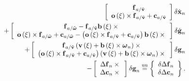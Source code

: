 \begin{align}
	\sqbr{\matr{c}{
		\T{f}_{a/\tilde{\T{v}}}
		\\
		\T{o}\plbr{\xi}\times\T{f}_{a/\tilde{\T{v}}} + \T{c}_{a/\tilde{\T{v}}}
	}} \delta\dot{\T{x}}_n
	\nonumber \\
	+ \sqbr{\matr{c}{
		\T{f}_{a/\tilde{\T{\omega}}} - \T{f}_{a/\tilde{\T{v}}} \T{b}\plbr{\xi}\times{}
		\\
		\T{o}\plbr{\xi} \times \T{f}_{a/\tilde{\T{\omega}}}
		+ \T{c}_{a/\tilde{\T{\omega}}}
		- \plbr{
			\T{o}\plbr{\xi} \times \T{f}_{a/\tilde{\T{v}}}
			+ \T{c}_{a/\tilde{\T{v}}}
		}
		\T{b}\plbr{\xi}\times{}
	}} \delta\dot{\T{g}}_n
	\nonumber \\
	+ \sqbr{\matr{c}{
		\T{f}_{a/\tilde{\T{v}}} \plbr{\T{v}\plbr{\xi} + \T{b}\plbr{\xi} \times \T{\omega}_n} \times{} \\
		\plbr{
			\T{o}\plbr{\xi} \times \T{f}_{a/\tilde{\T{v}}}
			+ \T{c}_{a/\tilde{\T{v}}}
		} \plbr{\T{v}\plbr{\xi} + \T{b}\plbr{\xi} \times \T{\omega}_n} \times{}
	}} \delta\T{g}_n
	\nonumber \\
	- \sqbr{\cvvect{
		\Delta\T{f}_n \times{} \\
		\Delta\T{c}_n \times{} \\
	}} \delta\T{g}_n
	\equu
	\cubr{\cvvect{
		\delta\Delta\T{f}_n \\
		\delta\Delta\T{c}_n
	}}
	.
\end{align}



